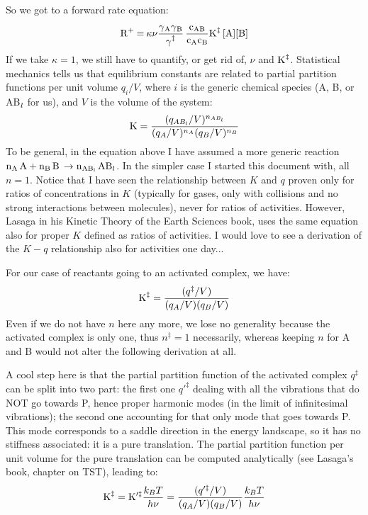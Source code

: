 \documentclass[12pt]{paper}    %
\begin{document}
So we got to a forward rate equation:
%
\begin{equation}
\ce{R+ = \kappa \nu \frac{\gamma_A\gamma_B}{\gamma^\ddag} \frac{c_{AB}}{c_Ac_B}K^{\ddag} [A][B]}
\end{equation}
%
If we take $\kappa=1$, we still have to quantify, or get rid of, $\nu$ and $\ce{K^\ddag}$. Statistical mechanics tells us that equilibrium constants are related to partial partition functions per unit volume $q_i/V$, where $i$ is the generic chemical species (A, B, or AB$\ce{_l}$ for us), and $V$ is the volume of the system:
%
\begin{equation}
\ce{K} = \frac{(q_{AB_l}/V)^{n_{AB_l}}}{(q_A/V)^{n_A} (q_B/V)^{n_B}}
\end{equation}
%
To be general, in the equation above I have assumed a more generic reaction $\ce{n_A A + n_B B \rightarrow n_{AB_l} AB_l}$. In the simpler case I started this document with, all $n=1$. Notice that I have seen the relationship between $K$ and $q$ proven only for ratios of concentrations in $K$ (typically for gases, only with collisions and no strong interactions between molecules), never for ratios of activities. However, Lasaga in his Kinetic Theory of the Earth Sciences book, uses the same equation also for proper $K$ defined as ratios of activities. I would love to see a derivation of the $K-q$ relationship also for activities one day...

For our case of reactants going to an activated complex, we have: 
%
\begin{equation}
\ce{K^\ddag} = \frac{(q^\ddag/V)}{(q_A/V)(q_B/V)}
\end{equation}
%
Even if we do not have $n$ here any more, we lose no generality because the activated complex is only one, thus $n^\ddag = 1$ necessarily, whereas keeping $n$ for A and B would not alter the following derivation at all.

A cool step here is that the partial partition function of the activated complex $q^\ddag$ can be split into two part: the first one $q'^\ddag$ dealing with all the vibrations that do NOT go towards P, hence proper harmonic modes (in the limit of infinitesimal vibrations); the second one accounting for that only mode that goes towards P. This mode corresponds to a saddle direction in the energy landscape, so it has no stiffness associated: it is a pure translation. The partial partition function per unit volume for the pure translation can be computed analytically (see Lasaga's book, chapter on TST), leading to:
%
\begin{equation}
\ce{K^\ddag} = \ce{K}'^\ddag \frac{k_BT}{h\nu} = \frac{(q'^\ddag/V)}{(q_A/V)(q_B/V)} \frac{k_BT}{h\nu}
\end{equation}
%
\end{document}
